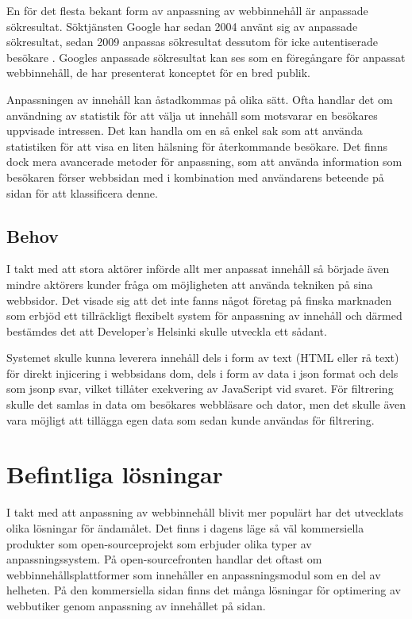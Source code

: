 En för det flesta bekant form av anpassning av webbinnehåll är anpassade sökresultat. Söktjänsten Google har sedan 2004 använt sig av anpassade sökresultat, sedan 2009 anpassas sökresultat dessutom för icke autentiserade besökare \citep{Hannak:2013:MPW:2488388.2488435}. Googles anpassade sökresultat kan ses som en föregångare för anpassat webbinnehåll, de har presenterat konceptet för en bred publik.

Anpassningen av innehåll kan åstadkommas på olika sätt. Ofta handlar det om användning av statistik för att välja ut innehåll som motsvarar en besökares uppvisade intressen. Det kan handla om en så enkel sak som att använda statistiken för att visa en liten hälsning för återkommande besökare. Det finns dock mera avancerade metoder för anpassning, som att använda information som besökaren förser webbsidan med i kombination med användarens beteende på sidan för att klassificera denne. \citep{Albanese:2004:WPB:1031453.1031469} 

\subsection{Behov}

I takt med att stora aktörer införde allt mer anpassat innehåll så började även mindre aktörers kunder fråga om möjligheten att använda tekniken på sina webbsidor. Det visade sig att det inte fanns något företag på finska marknaden som erbjöd ett tillräckligt flexibelt system för anpassning av innehåll och därmed bestämdes det att Developer's Helsinki skulle utveckla ett sådant.

Systemet skulle kunna leverera innehåll dels i form av text (HTML eller rå text) för direkt injicering i webbsidans \gls{dom}, dels i form av data i \gls{json} format och dels som \gls{jsonp} svar, vilket tillåter exekvering av JavaScript vid svaret. För filtrering skulle det samlas in data om besökares webbläsare och dator, men det skulle även vara möjligt att tillägga egen data som sedan kunde användas för filtrering.

\section{Befintliga lösningar}

I takt med att anpassning av webbinnehåll blivit mer populärt har det utvecklats olika lösningar för ändamålet. Det finns i dagens läge så väl kommersiella produkter som open-sourceprojekt som erbjuder olika typer av anpassningssystem. På open-sourcefronten handlar det oftast om webbinnehållsplattformer som innehåller en anpassningsmodul som en del av helheten. På den kommersiella sidan finns det många lösningar för optimering av webbutiker genom anpassning av innehållet på sidan.

